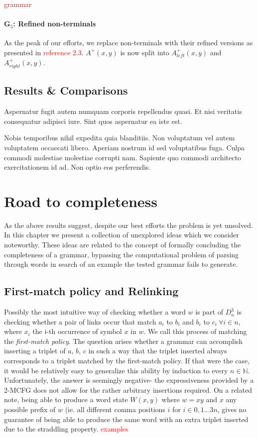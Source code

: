 \documentclass[nonatbib,numbers,10pt]{sigplanconf}
\newcommand\todo[1]{\textcolor{red}{#1}}
\begin{document}
\todo{grammar}

\paragraph{G$_5$: Refined non-terminals}
As the peak of our efforts, we replace non-terminals with their refined versions as presented in \todo{reference 2.3}. $A^{+}(x,y)$ is now split into $A^{+}_{left}(x,y)$ and $A^{+}_{right}(x,y)$. 
\subsection{Results \& Comparisons}
Aspernatur fugit autem numquam corporis repellendus quasi. Et nisi veritatis consequatur adipisci iure. Sint quos aspernatur ea iste est.

Nobis temporibus nihil expedita quia blanditiis. Non voluptatum vel autem voluptatem occaecati libero. Aperiam nostrum id sed voluptatibus fuga. Culpa commodi molestiae molestiae corrupti nam. Sapiente quo commodi architecto exercitationem id ad. Non optio eos perferendis.

\section{Road to completeness}
As the above results suggest, despite our best efforts the problem is yet unsolved. In this chapter we present a collection of unexplored ideas which we consider noteworthy. These ideas are related to the concept of formally concluding the completeness of a grammar, bypassing the computational problem of parsing through words in search of an example the tested grammar fails to generate.

\subsection{First-match policy and Relinking}
Possibly the most intuitive way of checking whether a word $w$ is part of $D^3_n$ is checking whether a pair of links occur that match $a_i$ to $b_i$ and $b_i$ to $c_i \ \forall i \in n$, where $x_i$ the i-th occurrence of symbol $x$ in $w$. We call this process of matching the \textit{first-match policy}. The question arises whether a grammar can accomplish inserting a triplet of $a$, $b$, $c$ in such a way that the triplet inserted always corresponds to a triplet matched by the first-match policy. If that were the case, it would be relatively easy to generalize this ability by induction to every $n \in \mathbb{N}$. Unfortunately, the answer is seemingly negative- the expressiveness provided by a 2-MCFG does not allow for the rather arbitrary insertions required. On a related note, being able to produce a word state $W(x,y)$ where $w=xy$ and $x$ any possible prefix of $w$ (ie. all different comma positions $i$ for $i \in 0,1...3n$, gives no guarantee of being able to produce the same word with an extra triplet inserted due to the straddling property. 
\todo{examples}
\end{document}
